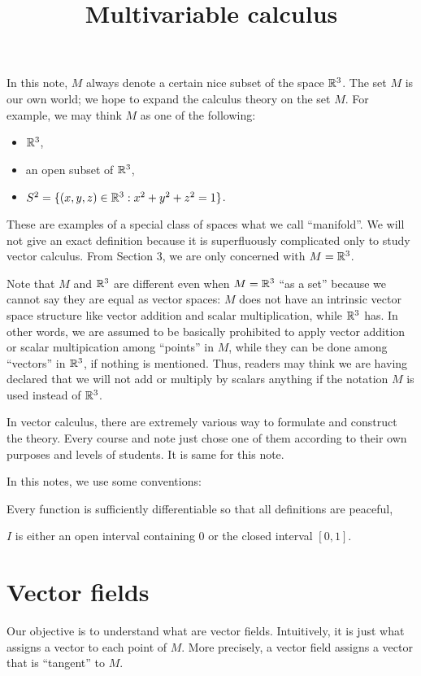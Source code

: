 \documentclass{../exp}
\title{Multivariable calculus}
\begin{document}
\maketitle
\tableofcontents





In this note, $M$ always denote a certain nice subset of the space $\mathbb{R}^3$.
The set $M$ is our own world; we hope to expand the calculus theory on the set $M$.
For example, we may think $M$ as one of the following:
\begin{itemize}
\item $\mathbb{R}^3$,
\item an open subset of $\mathbb{R}^3$,
\item $S^2=\{(x,y,z)\in\mathbb{R}^3:x^2+y^2+z^2=1\}$.
\end{itemize}
These are examples of a special class of spaces what we call ``manifold''.
We will not give an exact definition because it is superfluously complicated only to study vector calculus.
From Section 3, we are only concerned with $M=\mathbb{R}^3$.

Note that $M$ and $\mathbb{R}^3$ are different even when $M=\mathbb{R}^3$ ``as a set'' because we cannot say they are equal as vector spaces: $M$ does not have an intrinsic vector space structure like vector addition and scalar multiplication, while $\mathbb{R}^3$ has.
In other words, we are assumed to be basically prohibited to apply vector addition or scalar multipication among ``points'' in $M$, while they can be done among ``vectors'' in $\mathbb{R}^3$, if nothing is mentioned.
Thus, readers may think we are having declared that we will not add or multiply by scalars anything if the notation $M$ is used instead of $\mathbb{R}^3$.

In vector calculus, there are extremely various way to formulate and construct the theory.
Every course and note just chose one of them according to their own purposes and levels of students.
It is same for this note.

In this notes, we use some conventions:
\begin{cond}
\item Every function is sufficiently differentiable so that all definitions are peaceful,
\item $I$ is either an open interval containing 0 or the closed interval $[0,1]$.
\end{cond}




\section{Vector fields}
Our objective is to understand what are vector fields.
Intuitively, it is just what assigns a vector to each point of $M$.
More precisely, a vector field assigns a vector that is ``tangent'' to $M$.
\end{document}
